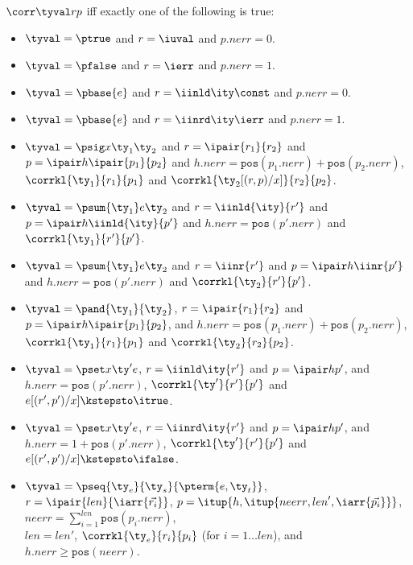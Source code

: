 \begin{definition}
$\corr \tyval r p$ iff exactly one of the following is true:
  \begin{itemize}
  \item $\tyval = \ptrue$ and $r = \iuval$ and $p.{nerr} = 0$.
  \item $\tyval = \pfalse$ and $r = \ierr$ and $p.{nerr} = 1$.
  \item $\tyval = \pbase{e}$ and $r = \iinld \ity \const$ and $p.{nerr} = 0$.
  \item $\tyval = \pbase{e}$ and $r = \iinrd \ity \ierr$ and $p.{nerr} = 1$.
  \item $\tyval = \psig x {\ty_1} {\ty_2}$ and $r =\ipair {r_1} {r_2}$ and $p =
    \ipair h {\ipair {p_1} {p_2}}$ 
    and $h.{nerr} = \mathtt{pos}(p_1.{nerr}) + \mathtt{pos}(p_2.{nerr})$, $\corrkl
    {\ty_1} {r_1} {p_1}$ and $\corrkl {\ty_2[(r,p)/x]} {r_2} {p_2}$.
  \item $\tyval = \psum {\ty_1} e {\ty_2}$ and $r =\iinld {\ity}{r'}$
    and $p = \ipair h {\iinld {\ity}{p'}}$
    and $h.{nerr} = \mathtt{pos}(p'.{nerr})$ and $\corrkl
    {\ty_1} {r'} {p'}$.
  \item $\tyval = \psum {\ty_1} e {\ty_2}$ and $r =\iinr {r'}$
    and $p = \ipair h {\iinr {p'}}$
    and $h.{nerr} = \mathtt{pos}(p'.{nerr})$ and $\corrkl
    {\ty_2} {r'} {p'}$.
  \item $\tyval = \pand {\ty_1} {\ty_2}$, $r = \ipair {r_1} {r_2}$ and $p =
    \ipair h {\ipair {p_1}{p_2}}$, 
    and $h.{nerr} = \mathtt{pos}(p_1.{nerr}) + \mathtt{pos}(p_2.{nerr})$, 
    $\corrkl {\ty_1} {r_1} {p_1}$ and $\corrkl {\ty_2} {r_2} {p_2}$.
  \item $\tyval = \pset x {\ty'} e$, $r = \iinld \ity {r'}$ and $p =
    \ipair h {p'}$, 
    and $h.{nerr} = \mathtt{pos}(p'.{nerr})$, $\corrkl {\ty'}{r'}{p'}$
    and $e[(r',p')/x] \kstepsto\itrue$.
  \item $\tyval = \pset x {\ty'} e$, $r = \iinrd \ity {r'}$
    and $p = \ipair h {p'}$,
    and $h.{nerr} = 1 + \mathtt{pos}(p'.{nerr})$,
    $\corrkl {\ty'}{r'}{p'}$ and $e[(r',p')/x] \kstepsto \ifalse$.
  \item $\tyval = \pseq {\ty_e}{\ty_s}{\pterm {e,\ty_t}}$, 
    $r = \ipair {len} {\iarr{\vec {r_i}}}$, $p = \itup{h,\itup{{neerr},{len}',\iarr {\vec {p_i}}}}$,
    ${neerr} = \sum_{i=1}^{len} \mathtt{pos}(p_i.{nerr})$, \\
    ${len} = {len}'$, $\corrkl {\ty_e}
    {r_i} {p_i}$ (for $i=1 \ldots {len}$), and
    $h.{nerr} \geq \mathtt{pos}({neerr})$.

\end{itemize}
\end{definition}
